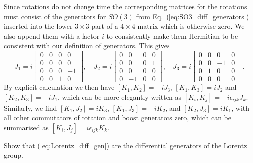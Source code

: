 \documentclass[notes.tex]{subfiles}
\begin{document}
\begin{Answer}
Since rotations do not change time the corresponding matrices for the rotations must consist of the generators for $SO(3)$ from Eq.~(\ref{eq:SO3_diff_generators}) inserted into the lower $3\times3$ part of a $4\times4$ matrix which is otherwise zero. We also append them with a factor $i$ to consistently make them Hermitian to be consistent with our definition of generators. This gives
\[ J_1 = i\left[\begin{matrix} 0 & 0  & 0 &  0\\  0 & 0 & 0 & 0 \\  0 & 0 & 0 & -1 \\ 0 & 0 & 1 & 0 \end{matrix}\right], \quad 
J_2 = i\left[\begin{matrix} 0 & 0  & 0 &  0\\  0 & 0 & 0 & 1 \\  0 & 0 & 0 & 0 \\ 0 & -1 & 0 & 0 \end{matrix}\right], \quad
J_3 = i\left[\begin{matrix} 0 & 0  & 0 &  0\\  0 & 0 & -1 & 0 \\  0 & 1 & 0 & 0 \\ 0 & 0 & 0 & 0 \end{matrix}\right].  \]
By explicit calculation we then have $[K_1,K_2] =-iJ_3$, $[K_1,K_3] =iJ_2$ and  $[K_2,K_3] =-iJ_1$, which can be more elegantly written as  $[K_i,K_j] =-i\epsilon_{ijk}J_k$. Similarly, we find $[K_1,J_2] =iK_3$, $[K_1,J_3] =-iK_2$, and $[K_2,J_3] =iK_1$, with all other commutators of rotation and boost generators zero, which can be summarised as $[K_i,J_j] =i\epsilon_{ijk}K_k$.
\end{Answer}


\begin{Exercise}[label=ex:Lorentz_diff_gem]
Show that (\ref{eq:Lorentz_diff_gen}) are the differential generators of the Lorentz group.
\end{Exercise}
\end{document}
